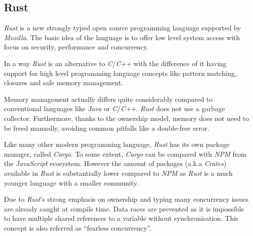 \subsection{Rust}

\textit{Rust} is a new strongly typed open source programming language supported by
\textit{Mozilla}. The basic idea of the language is to offer low level system access with focus on
security, performance and concurrency. \cite{rustbook1, forkjoin}

In a way \textit{Rust} is an alternative to \textit{C}/\textit{C++} with the difference of it having
support for high level programming language concepts like pattern matching, closures and safe memory
management. \cite{rustbook1, forkjoin}

Memory management actually differs quite considerably compared to conventional languages like
\textit{Java} or \textit{C}/\textit{C++}. \textit{Rust} does not use a garbage collector.
Furthermore, thanks to the ownership model, memory does not need to be freed manually, avoiding
common pitfalls like a double-free error.

Like many other modern programming language, \textit{Rust} has its own package manager, called
\textit{Cargo}. To some extent, \textit{Cargo} can be compared with \textit{NPM} from the
\textit{JavaScript} ecosystem. However the amount of packages (a.k.a \textit{Crates}) available in
\textit{Rust} is substantially lower compared to \textit{NPM} as \textit{Rust} is a much younger
language with a smaller community.

Due to \textit{Rust}'s strong emphasis on ownership and typing many concurrency issues are already
caught at compile time. Data races are prevented as it is impossible to have multiple shared
references to a variable without synchronisation. This concept is also referred as “fearless
concurrency”. \cite{rustbook2}

